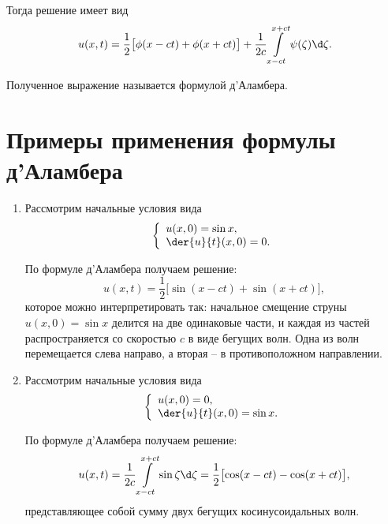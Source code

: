 Тогда решение имеет вид
\[
    u(x, t) = \frac{1}{2}\bigl[\phi(x - ct) + \phi(x + ct)\bigr] + \frac{1}{2c}
    \int\limits_{x - ct}^{x + ct} \psi(\zeta)\d\zeta.
\]

Полученное выражение называется формулой д'Аламбера.

\section{Примеры применения формулы д'Аламбера}
\begin{enumerate}
    \item Рассмотрим начальные условия вида 
    \[
        \left\{ \begin{array}{l}
            u(x, 0) = \sin x, \\
            \ds \der{u}{t}(x, 0) = 0.
        \end{array} \right.
    \]
    
    По формуле д'Аламбера получаем решение:
    \[
        u(x, t) = \frac{1}{2}\bigl[\sin(x - ct) + \sin(x + ct)\bigr],
    \]
    которое можно интерпретировать так: начальное смещение струны
    \( u(x, 0) = \sin x \) делится на две одинаковые части, и каждая из частей
    распространяется со скоростью \( c \) в виде бегущих волн.
    Одна из волн перемещается слева направо, а вторая -- в противоположном
    направлении.
    
    \item Рассмотрим начальные условия вида 
    \[
        \left\{ \begin{array}{l}
            u(x, 0) = 0, \\
            \ds \der{u}{t}(x, 0) = \sin x.
        \end{array} \right.
    \]
    
    По формуле д'Аламбера получаем решение:
    \[
        u(x, t) = \frac{1}{2c}\int\limits_{x - ct}^{x + ct} \sin\zeta\d\zeta =
        \frac{1}{2}\bigl[\cos(x - ct) - \cos(x + ct)\bigr],
    \]
    представляющее собой сумму двух бегущих косинусоидальных волн.
\end{enumerate}

\newpage
